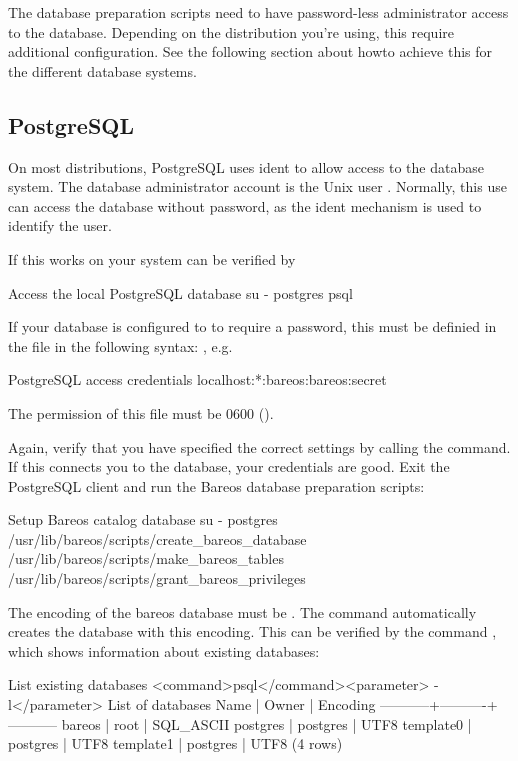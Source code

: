 The database preparation scripts need to have password-less administrator access to the database.
Depending on the distribution you're using, this require additional configuration.
See the following section about howto achieve this for the different database systems.

\subsection{PostgreSQL}

On most distributions, PostgreSQL uses ident to allow access to the database system.
The database administrator account is the Unix user .
Normally, this use can access the database without password, as the ident mechanism is used to identify the user.

If this works on your system can be verified by
\begin{commands}{Access the local PostgreSQL database}
su - postgres
psql
\end{commands}

If your database is configured to to require a password, this must be definied in the file
in the following syntax: , e.g.
\begin{config}{PostgreSQL access credentials}
localhost:*:bareos:bareos:secret
\end{config}
The permission of this file must be 0600 ().

Again, verify that you have specified the correct settings by calling the  command.
If this connects you to the database, your credentials are good.
Exit the PostgreSQL client and run the Bareos database preparation scripts:
\begin{commands}{Setup Bareos catalog database}
su - postgres
/usr/lib/bareos/scripts/create_bareos_database
/usr/lib/bareos/scripts/make_bareos_tables
/usr/lib/bareos/scripts/grant_bareos_privileges
\end{commands}


The encoding of the bareos database must be .
The command  automatically creates the database with this encoding.
This can be verified by the command , which  shows information about existing databases:
\begin{commands}{List existing databases}
<command>psql</command><parameter> -l</parameter>
        List of databases
   Name    |  Owner   | Encoding
-----------+----------+-----------
 bareos    | root     | SQL_ASCII
 postgres  | postgres | UTF8
 template0 | postgres | UTF8
 template1 | postgres | UTF8
(4 rows)
\end{commands}

